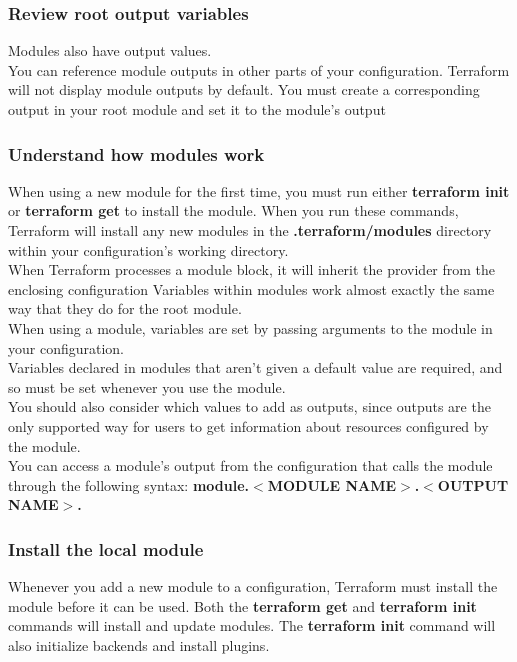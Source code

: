 \documentclass[12pt, letterpaper, twoside]{article}
\begin{document}
\subsubsection{Review root output variables}
Modules also have output values.\\
You can reference module outputs in other parts of your configuration. 
Terraform will not display module outputs by default. You must create a 
corresponding output in your root module and set it to the module's output

\subsubsection{Understand how modules work}
When using a new module for the first time, you must run either \textbf{terraform init}
or \textbf{terraform get} to install the module. When you run these commands, 
Terraform will install any new modules in the \textbf{.terraform/modules} 
directory within your configuration's working directory. \\

When Terraform processes a module block, it will inherit the provider from 
the enclosing configuration
Variables within modules work almost exactly the same way that they do for the root module.\\
When using a module, variables are set by passing arguments to the module in your 
configuration.\\
Variables declared in modules that aren't given a default value are required, 
and so must be set whenever you use the module.\\

You should also consider which values to add as outputs, since outputs are 
the only supported way for users to get information about resources 
configured by the module.\\

You can access a module's output from the configuration that calls the 
module through the following syntax: \textbf{module.$<$MODULE NAME$>$.$<$OUTPUT NAME$>$.}

\subsubsection{Install the local module}
Whenever you add a new module to a configuration, Terraform must install 
the module before it can be used. Both the \textbf{terraform get} and 
\textbf{terraform init} commands will install and update modules. 
The \textbf{terraform init} command will also initialize backends and install plugins.
\end{document}
